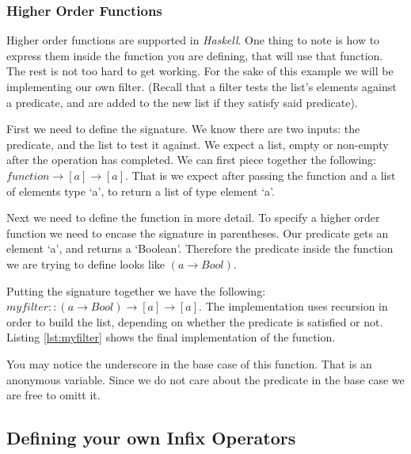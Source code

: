 

\subsubsection{Higher Order Functions}

Higher order functions are supported in \textit{Haskell}. One thing to note is
how to express them inside the function you are defining, that will use that
function. The rest is not too hard to get working. For the sake of this example
we will be implementing our own filter. (Recall that a filter tests the list's
elements against a predicate, and are added to the new list if they satisfy
said predicate).

First we need to define the signature. We know there are two inputs: the
predicate, and the list to test it against. We expect a list, empty or
non-empty after the operation has completed. We can first piece together the
following: $ function \rightarrow [a] \rightarrow [a] $. That is we expect
after passing the function and a list of elements type `a', to return a list of
type element `a'. 

Next we need to define the function in more detail. To specify a higher order
function we need to encase the signature in parentheses. Our predicate gets an
element `a', and returns a `Boolean'. Therefore the predicate inside the function
we are trying to define looks like $(a \rightarrow Bool)$.

Putting the signature together we have the following: $myfilter :: (a
\rightarrow Bool) \rightarrow [a] \rightarrow [a]$. The implementation uses
recursion in order to build the list, depending on whether the predicate is
satisfied or not. Listing \ref{lst:myfilter} shows the final implementation of
the function.


You may notice the underscore in the base case of this function. That is an
anonymous variable. Since we do not care about the predicate in the base case
we are free to omitt it.

\subsection{Defining your own Infix Operators}


